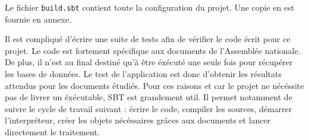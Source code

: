 Le fichier \verb|build.sbt| contient toute la configuration du projet. Une copie en est fournie en annexe.

Il est compliqué d'écrire une suite de tests afin de vérifier le code écrit pour ce projet. Le code est fortement spécifique aux documents de l'Assemblée nationale. De plus, il n'est au final destiné qu'à être éxécuté une seule fois pour récupérer les bases de données. Le test de l'application est donc d'obtenir les résultats attendus pour les documents étudiés.\newline
Pour ces raisons et car le projet ne nécéssite pas de livrer un éxécutable, SBT est grandement util. Il permet notamment de suivre le cycle de travail suivant : écrire le code, compiler les sources, démarrer l'interpréteur, créer les objets nécéssaires grâces aux documents et lancer directement le traitement.
